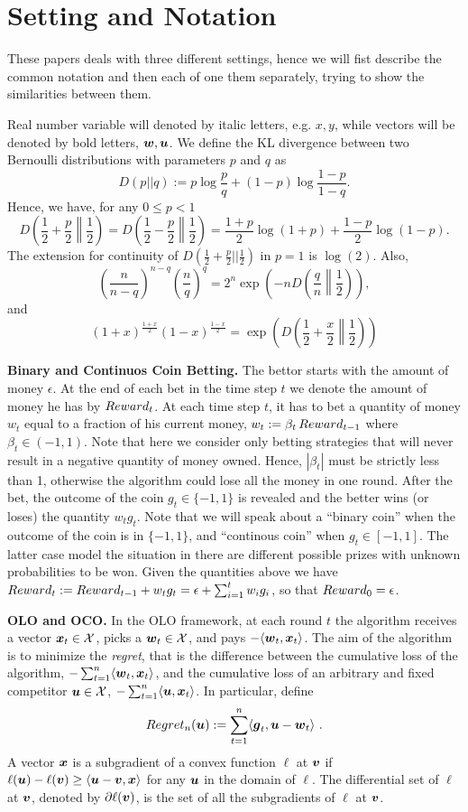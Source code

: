 \section{Setting and Notation}
These papers deals with three different settings, hence we will fist describe the common notation and then each of one them separately, trying to show the similarities between them.

Real number variable will denoted by italic letters, e.g. $x,y$, while vectors will be denoted by bold letters, $\boldsymbol{w},\boldsymbol{u}$.
We define the KL divergence between two Bernoulli distributions with parameters $p$ and $q$ as
\[
D(p||q) := p \log\frac{p}{q} + (1-p) \log\frac{1-p}{1-q}.
\]
Hence, we have, for any $ 0\leq p < 1$
\[
D\left(\frac{1}{2}+\frac{p}{2}\middle\|\frac{1}{2}\right) = D\left(\frac{1}{2}-\frac{p}{2}\middle\|\frac{1}{2}\right)= \frac{1+p}{2} \log(1+p) + \frac{1-p}{2} \log(1-p).
\]
The extension for continuity of $D(\frac{1}{2}+\frac{p}{2}||\frac{1}{2})$ in $p=1$ is $\log(2)$.
Also,
\[
\left(\frac{n}{n-q}\right)^{n-q} \left(\frac{n}{q}\right)^{q} = 2^n \exp\left(-n D\left(\frac{q}{n}\middle\|\frac{1}{2}\right)\right),
\]
and
\[
\left(1+x\right)^\frac{1+x}{2} \left(1-x\right)^\frac{1-x}{2}= \exp\left( D\left(\frac{1}{2}+\frac{x}{2}\middle\|\frac{1}{2}\right) \right)
\]

\textbf{Binary and Continuos Coin Betting.}
The bettor starts with the amount of money $\epsilon$. 
At the end of each bet in the time step $t$ we denote the amount of money he has by $Reward_t$.
At each time step $t$, it has to bet a quantity of money $w_t$ equal to a fraction of his current money, $w_t:=\beta_t \, Reward_{t-1}$ where $\beta_t \in (-1,1)$. Note that here we consider only betting strategies that will never result in a negative quantity of money owned. Hence, $|\beta_t|$ must be strictly less than 1, otherwise the algorithm could lose all the money in one round.
After the bet, the outcome of the coin $g_t \in \{-1,1\}$ is revealed and the better wins (or loses) the quantity $w_t g_t$.
Note that we will speak about a ``binary coin'' when the outcome of the coin is in $\{-1,1\}$, and ``continous coin'' when $g_t \in [-1,1]$. The latter case model the situation in there are different possible prizes with unknown probabilities to be won. Given the quantities above we have $Reward_t:=Reward_{t-1} + w_t g_t = \epsilon + \sum_{i=1}^t w_i g_i$, so that $Reward_0=\epsilon$.

\textbf{\ac{OLO} and \ac{OCO}.}
In the \ac{OLO} framework, at each round $t$ the algorithm receives a vector $\boldsymbol{x}_t \in \mathcal{X}$, picks a $\boldsymbol{w}_t \in \mathcal{X}$, and pays $-\langle \boldsymbol{w}_t,\boldsymbol{x}_t \rangle$.
The aim of the algorithm is to minimize the \emph{regret}, that is the difference between the cumulative loss of the algorithm, $-\sum_{t=1}^n \langle \boldsymbol{w}_t,\boldsymbol{x}_t \rangle$, and the cumulative loss of an arbitrary and fixed competitor $\boldsymbol{u} \in \mathcal{X}$, $-\sum_{t=1}^n \langle \boldsymbol{u},\boldsymbol{x}_t \rangle$.
In particular, define
\[
Regret_n(\boldsymbol{u}) := \sum_{t=1}^n \langle \boldsymbol{g}_t , \boldsymbol{u} - \boldsymbol{w}_t \rangle~.
\]
A vector $\boldsymbol{x}$ is a subgradient of a convex function $\ell$ at $\boldsymbol{v}$ if $\ell(\boldsymbol{u}) - \ell(\boldsymbol{v}) \ge \langle \boldsymbol{u} - \boldsymbol{v}, \boldsymbol{x} \rangle$ for any $\boldsymbol{u}$ in the domain of $\ell$. The differential set of $\ell$ at $\boldsymbol{v}$, denoted by $\partial \ell(\boldsymbol{v})$, is the set of all the subgradients of $\ell$ at $\boldsymbol{v}$.

